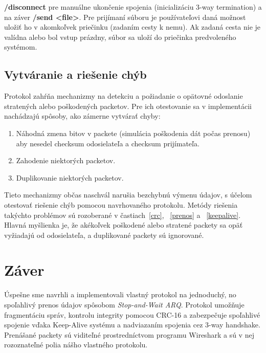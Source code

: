 \documentclass[a4paper,12pt]{article}
\begin{document}
\textbf{/disconnect} pre manuálne ukončenie spojenia (inicializáciu 3-way termination) a na záver \textbf{/send <file>}. Pre prijímaní súboru je používateľovi daná možnost uložiť ho v akomkoľvek priečinku (zadaním cesty k nemu). Ak zadaná cesta nie je valídna alebo bol vstup prázdny, súbor sa uloží do priečinka predvoleného systémom.

    \subsection{Vytváranie a riešenie chýb}
    Protokol zahŕňa mechanizmy na detekciu a požiadanie o opätovné odoslanie stratených alebo poškodených packetov. Pre ich otestovanie sa v implementácii nachádzajú spôsoby, ako zámerne vytvárať chyby:
	\begin{enumerate}
		\item Náhodná zmena bitov v packete (simulácia poškodenia dát počas prenosu) aby nesedel checksum odosielateľa a checksum prijímateľa.
		\item Zahodenie niektorých packetov.
		\item Duplikovanie niektorých packetov. 
	\end{enumerate}

	Tieto mechanizmy občas naschvál narušia bezchybnú výmenu údajov, s účelom otestovať riešenie chýb pomocou navrhovaného protokolu. Metódy riešenia takýchto problémov sú rozoberané v častiach~\ref{crc}, ~\ref{prenos} a ~\ref{keepalive}. Hlavná myšlienka je, že akékoľvek poškodené alebo stratené packety sa opäť vyžiadajú od odosielateľa, a duplikované packety sú ignorované.


\section{Záver}
	Úspešne sme navrhli a implementovali vlastný protokol na jednoduchý, no spoľahlivý prenos údajov spôsobom \textit{Stop-and-Wait ARQ}. Protokol umožňuje fragmentáciu správ, kontrolu integrity pomocou CRC-16 a zabezpečuje spoľahlivé spojenie vďaka Keep-Alive systému a nadviazaním spojenia cez 3-way handshake. Prenášané packety sú viditeľné prostredníctvom programu Wireshark a sú v nej rozoznateľné polia nášho vlastného protokolu.
\end{document}
